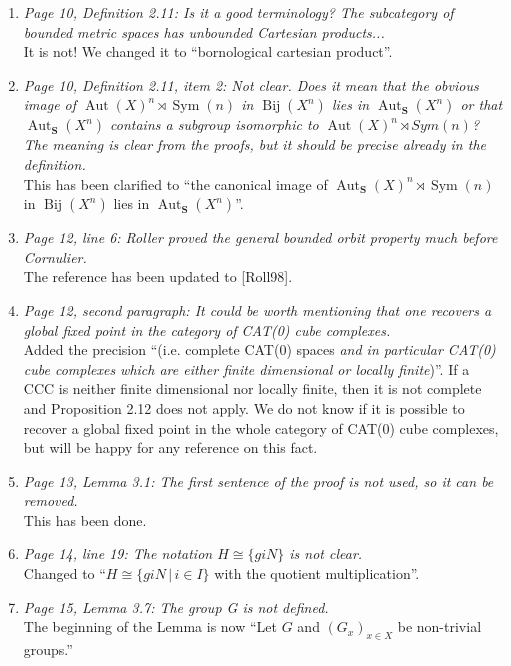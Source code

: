 \documentclass[english,a4paper]{article}
\DeclareMathOperator\Aut{Aut}
\DeclareMathOperator\Sym{Sym}
\DeclareMathOperator\Bij{Bij}
\newcommand*\setst[2]{\{#1\,|\,#2\}}
\begin{document}
\begin{enumerate}
%
\item\textit{Page 10, Definition 2.11: Is it a good terminology? The subcategory of bounded metric spaces has unbounded Cartesian products...}\\
It is not! We changed it to ``bornological cartesian product''.
%
\item\textit{Page 10, Definition 2.11, item 2: Not clear. Does it mean that the obvious image of $\Aut(X)^n\rtimes\Sym(n)$ in $\Bij(X^n)$ lies in $\Aut_{\mathbf S}(X^n)$ or that $\Aut_{\mathbf S}(X^n)$ contains a subgroup isomorphic to $\Aut(X)^n\rtimes Sym(n)$? The meaning is clear from the proofs, but it should be precise already in the definition.}\\
This has been clarified to ``the canonical image of $\Aut_{\mathbf S}(X)^n\rtimes \Sym(n)$ in $\Bij(X^n)$ lies in $\Aut_{\mathbf S}(X^n)$''.
%
\item\textit{Page 12, line 6: Roller proved the general bounded orbit property much before Cornulier.}\\
The reference has been updated to [Roll98].
%
\item\textit{Page 12, second paragraph: It could be worth mentioning that one recovers a global fixed point in the category of CAT(0) cube complexes.
}\\
Added the precision ``(i.e. complete CAT(0) spaces \emph{and in particular CAT(0) cube complexes which are either finite dimensional or locally finite})''.
If a CCC is neither finite dimensional nor locally finite, then it is not complete and Proposition 2.12 does not apply.
We do not know if it is possible to recover a global fixed point in the whole category of CAT(0) cube complexes, but will be happy for any reference on this fact.
%
\item\textit{Page 13, Lemma 3.1: The first sentence of the proof is not used, so it can be removed.}\\
This has been done.
%
\item\textit{Page 14, line 19: The notation $H\cong\{giN\}$ is not clear.}\\
Changed to ``$H\cong\setst{giN}{i\in I}$ with the quotient multiplication''.
%
%
\setcounter{enumi}{21}
%
\item\textit{Page 15, Lemma 3.7: The group G is not defined.}\\
The beginning of the Lemma is now ``Let $G$ and $(G_x)_{x\in X}$ be non-trivial groups.''

\end{enumerate}
\end{document}
